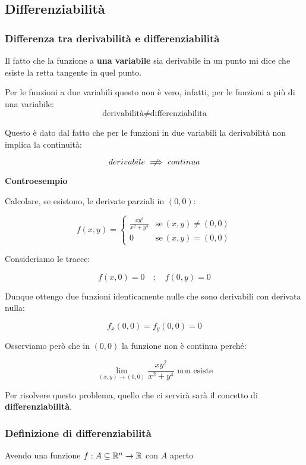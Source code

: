 \subsection{Differenziabilità}

\subsubsection{Differenza tra derivabilità e differenziabilità}

Il fatto che la funzione a \textbf{una variabile} sia derivabile in un punto mi dice che esiste la retta tangente in quel punto.

Per le funzioni a due variabili questo non è vero, infatti, per le funzioni a più di una variabile:
\[\text{derivabilità} \ne \text{differenziabilita}\]

Questo è dato dal fatto che per le funzioni in due variabili la derivabilità non implica la continuità:

\[
    derivabile \centernot\implies continua
\]

\textbf{Controesempio}

Calcolare, se esistono, le derivate parziali in \((0,0)\):

\[
    f(x,y)=
    \begin{cases}
        \frac{xy^{2}}{x^{2}+y^{4}} & \text{se}\ (x,y)\neq (0,0) \\
        0                          & \text{se}\ (x,y)=(0,0)
    \end{cases}
\]

Consideriamo le tracce:

\[
    f(x,0) = 0 \quad;\quad f(0,y) =0
\]

Dunque ottengo due funzioni identicamente nulle che sono derivabili con derivata nulla:

\[
    f_x(0,0) = f_y(0,0) = 0
\]

Osserviamo però che in \((0,0)\) la funzione non è continua perché:

\[
    \lim_{ (x,y) \to (0,0) } \frac{xy^{2}}{x^{2}+y^{4}} \text{ non esiste}
\]

Per risolvere questo problema, quello che ci servirà sarà il concetto di \textbf{differenziabilità}.

\filbreak{}
\subsubsection{Definizione di differenziabilità}

Avendo una funzione \(f:A\subseteq \mathbb{R}^{n} \rightarrow \mathbb{R} \) con \(A\) aperto

